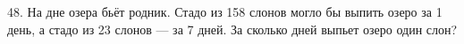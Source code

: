 48. На дне озера бьёт родник. Стадо из 158 слонов могло бы выпить озеро за 1 день, а стадо из 23 слонов --- за 7 дней. За сколько дней выпьет озеро один слон?\\
